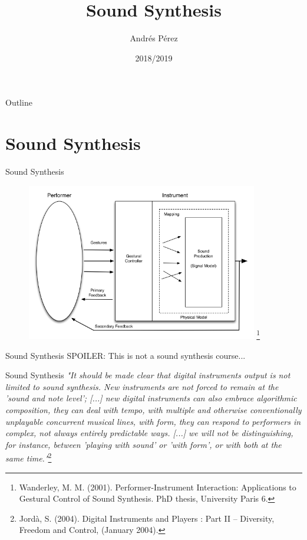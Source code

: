 \documentclass{beamer}
\title[Sound Synthesis]{Sound Synthesis}
\author{Andrés Pérez}
\institute{Digital Lutherie\\Master en Música para Experiencias del Entretenimiento\\ENTI-UB}
\date{2018/2019}
\newcommand\blfootnote[1]{%
  \begingroup
  \renewcommand\thefootnote{}\footnote{#1}%
  \addtocounter{footnote}{-1}%
  \endgroup
}
\begin{document}
\begin{frame}
  \titlepage
\end{frame}



\begin{frame}{Outline}
 \tableofcontents
\end{frame}

\section{Sound Synthesis}


\begin{frame}{Sound Synthesis}
    \begin{figure}[h]
        \includegraphics[width=0.9\textwidth]{instrument_scheme.png}\blfootnote{Wanderley, M. M. (2001). Performer-Instrument Interaction: Applications to Gestural Control of Sound Synthesis. PhD thesis, University Paris 6.}
    \end{figure}
\end{frame}

\begin{frame}{Sound Synthesis}
    SPOILER: This is not a sound synthesis course...
\end{frame}


\begin{frame}{Sound Synthesis}
    \textit{"It should be made clear that digital instruments output is not limited to sound synthesis. New instruments are not forced to remain at the 'sound and note level'; [...] new digital instruments can also embrace algorithmic composition, they can deal with tempo, with multiple and otherwise conventionally unplayable concurrent musical lines, with form, they can respond to performers in complex, not always entirely predictable ways. [...] we will not be distinguishing, for instance, between 'playing with sound' or 'with form', or with both at the same time."}\footnote{Jordà, S. (2004). Digital Instruments and Players : Part II – Diversity, Freedom and Control, (January 2004).}
\end{frame}
\end{document}
